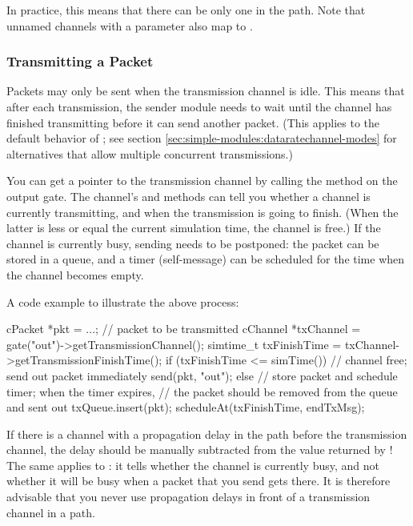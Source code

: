 \begin{note}
  In practice, this means that there can be only one 
  in the path. Note that unnamed channels with a  parameter
  also map to .
\end{note}


\subsubsection{Transmitting a Packet}
\label{sec:simple-modules:transmitting-a-packet}

Packets may only be sent when the transmission channel is idle.
This means that after each transmission, the sender module needs
to wait until the channel has finished transmitting before it can
send another packet. (This applies to the default behavior of
; see section
\ref{sec:simple-modules:dataratechannel-modes} for alternatives that
allow multiple concurrent transmissions.)

You can get a pointer to the transmission channel by calling the
 method on the output gate.
The channel's  and 
methods can tell you whether a channel is currently transmitting,
and when the transmission is going to finish. (When the latter is
less or equal the current simulation time, the channel is free.)
If the channel is currently busy, sending needs to be postponed:
the packet can be stored in a queue, and a timer (self-message) can be
scheduled for the time when the channel becomes empty.

A code example to illustrate the above process:

\begin{cpp}
cPacket *pkt = ...; // packet to be transmitted
cChannel *txChannel = gate("out")->getTransmissionChannel();
simtime_t txFinishTime = txChannel->getTransmissionFinishTime();
if (txFinishTime <= simTime()) {
    // channel free; send out packet immediately
    send(pkt, "out");
}
else {
    // store packet and schedule timer; when the timer expires,
    // the packet should be removed from the queue and sent out
    txQueue.insert(pkt);
    scheduleAt(txFinishTime, endTxMsg);
}
\end{cpp}

\begin{note}
  If there is a channel with a propagation delay in
  the path before the transmission channel, the delay should be manually
  subtracted from the value returned by !
  The same applies to : it tells whether the channel is
  currently busy, and not whether it will be busy when a packet that you send
  gets there. It is therefore advisable that you never use propagation delays
  in front of a transmission channel in a path.
\end{note}

